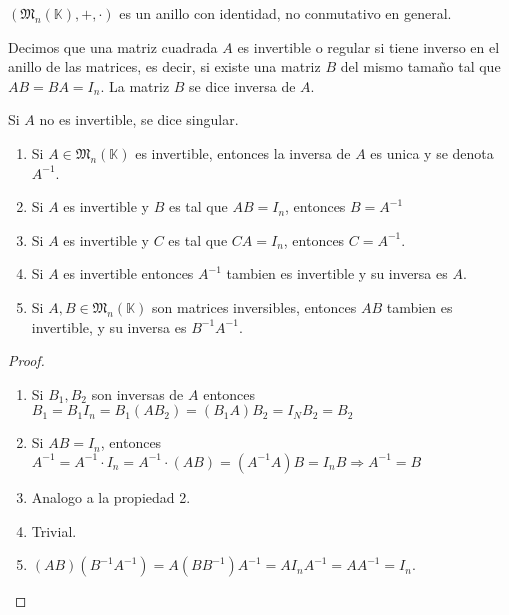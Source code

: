 \begin{proposition}
	\((\mathfrak{M}_{n}(\mathbb{K}), +, \cdot)\) es un anillo con identidad, no conmutativo en general.
\end{proposition}

\begin{definition}
	Decimos que una matriz cuadrada \(A \) es invertible o regular si tiene inverso en el anillo de las matrices, es decir, si existe una matriz \(B \) del mismo tamaño tal que \(AB = BA = I_n \). La matriz \(B \) se dice inversa de \(A \).

	Si \(A \) no es invertible, se dice singular.
\end{definition}

\begin{proposition}
	\begin{enumerate}
		\item Si \(A \in  \mathfrak{M}_{n}(\mathbb{K}) \) es invertible, entonces la inversa de \(A \) es unica y se denota \(A^{-1} \).
		\item Si \(A \) es invertible y \(B \) es tal que \(AB = I_n \), entonces \(B = A^{-1} \)
		\item Si \(A \) es invertible y \(C \) es tal que \(CA = I_n \), entonces \(C = A^{-1}\).
		\item Si \(A \) es invertible entonces \(A^{-1}  \) tambien es invertible y su inversa es \(A \).
		\item Si \(A,B \in  \mathfrak{M}_{n}(\mathbb{K}) \) son matrices inversibles, entonces \(AB \) tambien es invertible, y su inversa es \(B^{-1} A^{-1} \).
	\end{enumerate}
\end{proposition}
\begin{proof}
	\begin{enumerate}
		\item Si \(B_1, B_2 \) son inversas de \(A \) entonces \(B_1 = B_1 I_n = B_1 (A B_2) = (B_1 A) B_2 = I_N B_2 = B_2\)
		\item Si \(AB = I_n \), entonces \(A^{-1} = A^{-1} \cdot I_n = A^{-1} \cdot (AB) = (A^{-1} A)B = I_n B \Rightarrow A^{-1} = B\)
		\item Analogo a la propiedad 2.
		\item Trivial.
		\item \((AB)(B^{-1} A^{-1} ) = A(B B^{-1} ) A^{-1}  = AI_n A^{-1} = A A^{-1} = I_n \).
	\end{enumerate}
\end{proof}


